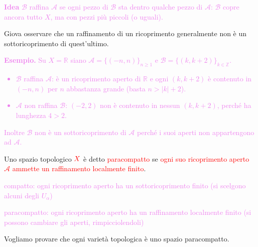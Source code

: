         \textcolor{violet}{\textbf{Idea} $\mathcal{B}$ raffina $\mathcal{A}$ se ogni pezzo di $\mathcal{B}$
        sta dentro qualche pezzo di $\mathcal{A}$: $\mathcal{B}$ copre ancora tutto $X$, ma con
        pezzi più piccoli (o uguali).}

        Giova osservare che un raffinamento di un ricoprimento generalmente non è un sottoricoprimento di quest'ultimo.

        \textcolor{violet}{\textbf{Esempio.} Su $X=\mathbb{R}$ siano
        $\mathcal{A}=\{(-n,n)\}_{n\ge1}$ e $\mathcal{B}=\{(k,k+2)\}_{k\in\mathbb{Z}}$.
        \begin{itemize}
        \item $\mathcal{B}$ raffina $\mathcal{A}$: è un ricoprimento aperto di $\mathbb{R}$ e
        ogni $(k,k+2)$ è contenuto in $(-n,n)$ per $n$ abbastanza grande
        (basta $n>|k|+2$).
        \item $\mathcal{A}$ non raffina $\mathcal{B}$: $(-2,2)$ non è contenuto in
        nessun $(k,k+2)$, perché ha lunghezza $4>2$.
        \end{itemize}
        Inoltre $\mathcal{B}$ non è un sottoricoprimento di $\mathcal{A}$ perché i suoi aperti
        non appartengono ad $\mathcal{A}$.}
        \begin{definizione}
        \label{def:spazio_paracompatto}
        \mbox{}

        Uno spazio topologico $\textcolor{red}{X}$ è detto \textcolor{red}{paracompatto} 
        se \textcolor{red}{ogni suo ricoprimento aperto $\mathcal{A}$ ammette un raffinamento localmente finito}.
        \end{definizione}
        \textcolor{violet}{compatto: ogni ricoprimento aperto ha un sottoricoprimento finito (si scelgono alcuni degli $U_\alpha$)}

        \textcolor{violet}{paracompatto: ogni ricoprimento aperto ha un raffinamento localmente finito (si possono cambiare gli aperti, rimpicciolendoli)}

        Vogliamo provare che ogni varietà topologica è uno spazio paracompatto.



